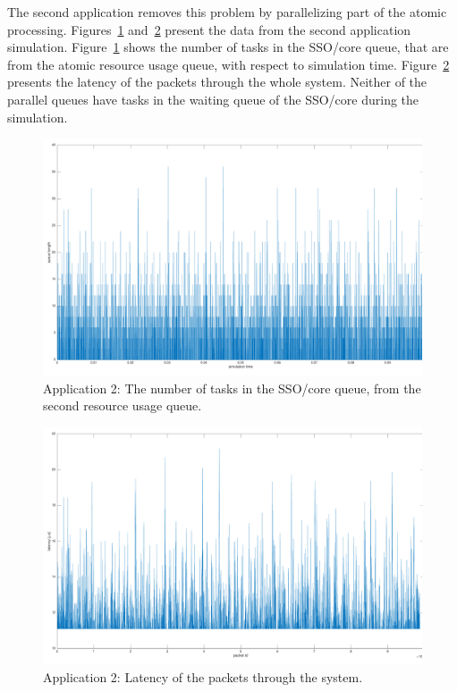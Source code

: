 The second application removes this problem by parallelizing part of the atomic processing. Figures~\ref{fig:app2-queue2} and~\ref{fig:app2-latency} present the data from the second application simulation. Figure~\ref{fig:app2-queue2} shows the number of tasks in the SSO/core queue, that are from the atomic resource usage queue, with respect to simulation time. Figure~\ref{fig:app2-latency} presents the latency of the packets through the whole system. Neither of the parallel queues have tasks in the waiting queue of the SSO/core during the simulation.

\begin{figure}[]
  \begin{center}
    \includegraphics[width=\textwidth]{images/app2-queue2.pdf}
    \caption{Application 2: The number of tasks in the SSO/core queue, from the second resource usage queue.}
    \label{fig:app2-queue2}
  \end{center}
\end{figure}

\begin{figure}[]
  \begin{center}
    \includegraphics[width=\textwidth]{images/app2-latency.pdf}
    \caption{Application 2: Latency of the packets through the system.}
    \label{fig:app2-latency}
  \end{center}
\end{figure}

